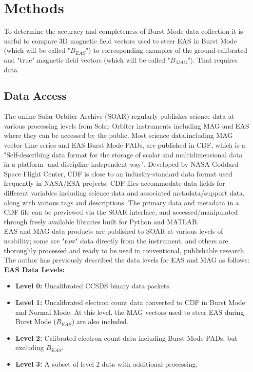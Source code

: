 \chapter{Methods}
\label{chapterlabel2}

To determine the accuracy and completeness of Burst Mode data collection it is useful to compare 3D magnetic field vectors used to steer EAS in Burst Mode (which will be called "\(B_{EAS}\)") to corresponding examples of the ground-calibrated and "true" magnetic field vectors (which will be called "\(B_{MAG}\)"). That requires data.
\\

\section{Data Access}
The online Solar Orbiter Archive (SOAR) regularly publishes science data at various processing levels from Solar Orbiter instruments including MAG and EAS where they can be accessed by the public\cite{soar}. Most science data,including MAG vector time series and EAS Burst Mode PADs, are published in CDF, which is a "Self-describing data format for the storage of scalar and multidimensional data in a platform- and discipline-independent way"\cite{cdf}. Developed by NASA Goddard Space Flight Center, CDF is close to an industry-standard data format used frequently in NASA/ESA projects\cite{horbury2020}. CDF files accommodate data fields for different variables including science data and associated metadata/support data, along with various tags and descriptions. The primary data and metadata in a CDF file can be previewed via the SOAR interface, and accessed/manipulated through freely available libraries built for Python and MATLAB\cite{cdf}.
\\

EAS and MAG data products are published to SOAR at various levels of usability; some are "raw" data directly from the instrument, and others are thoroughly processed and ready to be used in conventional, publishable research\cite{horbury2020}\cite{owen2020}\cite{zouganelis2020}. The author has previously described the data levels for EAS and MAG as follows\cite{dickson2024}:
\\

\textbf{EAS Data Levels\cite{owen2020}:}
\begin{itemize}
    \item \textbf{Level 0:} Uncalibrated CCSDS\cite{CCSDS_Standards_2022} binary data packets.
    \item \textbf{Level 1:} Uncalibrated electron count data converted to CDF in Burst Mode and Normal Mode. At this level, the MAG vectors used to steer EAS during Burst Mode (\(B_{EAS}\)) are also included.
    \item \textbf{Level 2:} Calibrated electron count data including Burst Mode PADs, but excluding \(B_{EAS}\).
    \item \textbf{Level 3:} A subset of level 2 data with additional processing.
\end{itemize}
\\

